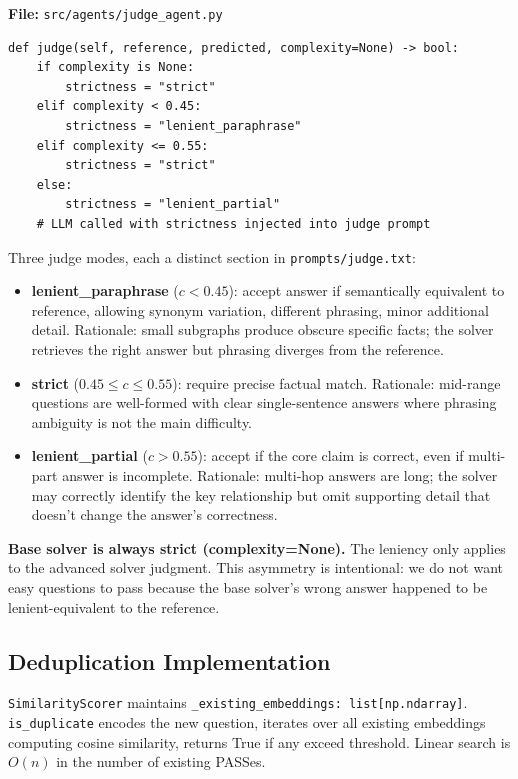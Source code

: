 \documentclass[11pt,a4paper]{article}
\begin{document}
\textbf{File:} \texttt{src/agents/judge\_agent.py}

\begin{lstlisting}[style=py]
def judge(self, reference, predicted, complexity=None) -> bool:
    if complexity is None:
        strictness = "strict"
    elif complexity < 0.45:
        strictness = "lenient_paraphrase"
    elif complexity <= 0.55:
        strictness = "strict"
    else:
        strictness = "lenient_partial"
    # LLM called with strictness injected into judge prompt
\end{lstlisting}

Three judge modes, each a distinct section in \texttt{prompts/judge.txt}:
\begin{itemize}[leftmargin=*,noitemsep]
  \item \textbf{lenient\_paraphrase} ($c < 0.45$): accept answer if semantically equivalent to reference, allowing synonym variation, different phrasing, minor additional detail. Rationale: small subgraphs produce obscure specific facts; the solver retrieves the right answer but phrasing diverges from the reference.
  \item \textbf{strict} ($0.45 \leq c \leq 0.55$): require precise factual match. Rationale: mid-range questions are well-formed with clear single-sentence answers where phrasing ambiguity is not the main difficulty.
  \item \textbf{lenient\_partial} ($c > 0.55$): accept if the core claim is correct, even if multi-part answer is incomplete. Rationale: multi-hop answers are long; the solver may correctly identify the key relationship but omit supporting detail that doesn't change the answer's correctness.
\end{itemize}

\textbf{Base solver is always strict (complexity=None).} The leniency only applies to the advanced solver judgment. This asymmetry is intentional: we do not want easy questions to pass because the base solver's wrong answer happened to be lenient-equivalent to the reference.

\subsection{Deduplication Implementation}

\texttt{SimilarityScorer} maintains \texttt{\_existing\_embeddings: list[np.ndarray]}. \texttt{is\_duplicate} encodes the new question, iterates over all existing embeddings computing cosine similarity, returns True if any exceed threshold. Linear search is $O(n)$ in the number of existing PASSes.
\end{document}
